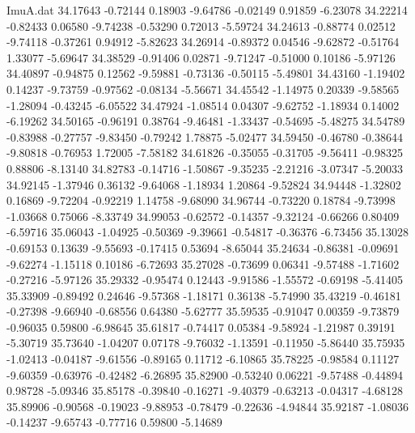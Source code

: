 \begin{filecontents}{ImuA.dat}
  34.17643   -0.72144    0.18903   -9.64786   -0.02149    0.91859   -6.23078
  34.22214   -0.82433    0.06580   -9.74238   -0.53290    0.72013   -5.59724
  34.24613   -0.88774    0.02512   -9.74118   -0.37261    0.94912   -5.82623
  34.26914   -0.89372    0.04546   -9.62872   -0.51764    1.33077   -5.69647
  34.38529   -0.91406    0.02871   -9.71247   -0.51000    0.10186   -5.97126
  34.40897   -0.94875    0.12562   -9.59881   -0.73136   -0.50115   -5.49801
  34.43160   -1.19402    0.14237   -9.73759   -0.97562   -0.08134   -5.56671
  34.45542   -1.14975    0.20339   -9.58565   -1.28094   -0.43245   -6.05522
  34.47924   -1.08514    0.04307   -9.62752   -1.18934    0.14002   -6.19262
  34.50165   -0.96191    0.38764   -9.46481   -1.33437   -0.54695   -5.48275
  34.54789   -0.83988   -0.27757   -9.83450   -0.79242    1.78875   -5.02477
  34.59450   -0.46780   -0.38644   -9.80818   -0.76953    1.72005   -7.58182
  34.61826   -0.35055   -0.31705   -9.56411   -0.98325    0.88806   -8.13140
  34.82783   -0.14716   -1.50867   -9.35235   -2.21216   -3.07347   -5.20033
  34.92145   -1.37946    0.36132   -9.64068   -1.18934    1.20864   -9.52824
  34.94448   -1.32802    0.16869   -9.72204   -0.92219    1.14758   -9.68090
  34.96744   -0.73220    0.18784   -9.73998   -1.03668    0.75066   -8.33749
  34.99053   -0.62572   -0.14357   -9.32124   -0.66266    0.80409   -6.59716
  35.06043   -1.04925   -0.50369   -9.39661   -0.54817   -0.36376   -6.73456
  35.13028   -0.69153    0.13639   -9.55693   -0.17415    0.53694   -8.65044
  35.24634   -0.86381   -0.09691   -9.62274   -1.15118    0.10186   -6.72693
  35.27028   -0.73699    0.06341   -9.57488   -1.71602   -0.27216   -5.97126
  35.29332   -0.95474    0.12443   -9.91586   -1.55572   -0.69198   -5.41405
  35.33909   -0.89492    0.24646   -9.57368   -1.18171    0.36138   -5.74990
  35.43219   -0.46181   -0.27398   -9.66940   -0.68556    0.64380   -5.62777
  35.59535   -0.91047    0.00359   -9.73879   -0.96035    0.59800   -6.98645
  35.61817   -0.74417    0.05384   -9.58924   -1.21987    0.39191   -5.30719
  35.73640   -1.04207    0.07178   -9.76032   -1.13591   -0.11950   -5.86440
  35.75935   -1.02413   -0.04187   -9.61556   -0.89165    0.11712   -6.10865
  35.78225   -0.98584    0.11127   -9.60359   -0.63976   -0.42482   -6.26895
  35.82900   -0.53240    0.06221   -9.57488   -0.44894    0.98728   -5.09346
  35.85178   -0.39840   -0.16271   -9.40379   -0.63213   -0.04317   -4.68128
  35.89906   -0.90568   -0.19023   -9.88953   -0.78479   -0.22636   -4.94844
  35.92187   -1.08036   -0.14237   -9.65743   -0.77716    0.59800   -5.14689

\end{filecontents}
